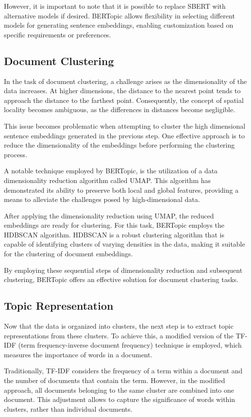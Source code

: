 \documentclass[a4paper,10pt]{report} %
\begin{document}
However, it is important to note that it is possible to replace SBERT with alternative models if desired. BERTopic allows flexibility in selecting different models for generating sentence embeddings, enabling customization based on specific requirements or preferences.

\subsection{Document Clustering}
In the task of document clustering, a challenge arises as the dimensionality of the data increases. At higher dimensions, the distance to the nearest point tends to approach the distance to the farthest point. Consequently, the concept of spatial locality becomes ambiguous, as the differences in distances become negligible.

This issue becomes problematic when attempting to cluster the high dimensional sentence embeddings generated in the previous step. One effective approach is to reduce the dimensionality of the embeddings before performing the clustering process.

A notable technique employed by BERTopic, is the utilization of a data dimensionality reduction algorithm called UMAP. This algorithm has demonstrated its ability to preserve both local and global features, providing a means to alleviate the challenges posed by high-dimensional data.

After applying the dimensionality reduction using UMAP, the reduced embeddings are ready for clustering. For this task, BERTopic employs the HDBSCAN algorithm. HDBSCAN is a robust clustering algorithm that is capable of identifying clusters of varying densities in the data, making it suitable for the clustering of document embeddings.

By employing these sequential steps of dimensionality reduction and subsequent clustering, BERTopic offers an effective solution for document clustering tasks.

\subsection{Topic Representation}
Now that the data is organized into clusters, the next step is to extract topic representations from these clusters. To achieve this, a modified version of the TF-IDF (term frequency-inverse document frequency) technique is employed, which measures the importance of words in a document.

Traditionally, TF-IDF considers the frequency of a term within a document and the number of documents that contain the term. However, in the modified approach, all documents belonging to the same cluster are combined into one document. This adjustment allows to capture the significance of words within clusters, rather than individual documents.
\end{document}
